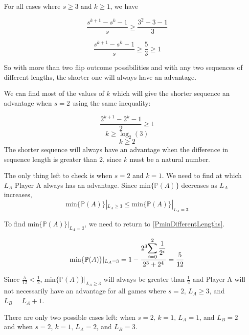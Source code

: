 \documentclass[english,12pt,a4paper,final]{article}
\begin{document}
For all cases where $s \ge 3$ and $k \ge 1$, we have 

\begin{equation*}
	\frac{s^{k+1}-s^k-1}{s} \ge \frac{3^2-3-1}{3}
\end{equation*}

\begin{equation*}
	\frac{s^{k+1}-s^k-1}{s} \ge \frac{5}{3} \ge 1
\end{equation*}

So with more than two flip outcome possibilities and with any two sequences of different lengths, the shorter one will always have an advantage.

We can find most of the values of $k$ which will give the shorter sequence an advantage when $s=2$ using the same inequality:

\begin{equation*}
	\frac{2^{k+1}-2^k-1}{2} \ge 1
\end{equation*}
\begin{equation*}
	k \ge \log_2(3)
\end{equation*}
\begin{equation*}
	k \ge 2
\end{equation*}
The shorter sequence will always have an advantage when the difference in sequence length is greater than 2, since $k$ must be a natural number.

The only thing left to check is when $s=2$ and $k=1$. We need to find at which $L_A$ Player A always has an advantage. Since $\text{min}\{\mathbb{P}(A)\}$ decreases as $L_A$ increases,
\begin{equation*}
	\text{min}\{\mathbb{P}(A)\}|_{L_A \ge 3} \le \text{min}\{\mathbb{P}(A)\}|_{L_A = 3}
\end{equation*}

To find $\text{min}\{\mathbb{P}(A)\}|_{L_A = 3}$, we need to return to \eqref{PminDifferentLengths}. 

\begin{equation*}
	\text{min}\{\mathbb{P}(A)\}|_{L_A = 3} = 1-\frac{2^3 \mathlarger{\sum_{i=0}^{2} \frac{1}{2^i}}}{2^3+2^4} = \frac{5}{12}
\end{equation*}

Since $\frac{5}{12} < \frac{1}{2}$, $\text{min}\{\mathbb{P}(A)\}|_{L_A \ge 3}$ will always be greater than $\frac{1}{2}$ and Player A will not necessarily have an advantage for all games where $s=2$, $L_A \ge 3$, and $L_B = L_A + 1$.

There are only two possible cases left: when $s=2$, $k=1$, $L_A=1$, and $L_B=2$ and when $s=2$, $k=1$, $L_A=2$, and $L_B=3$. 
\end{document}
